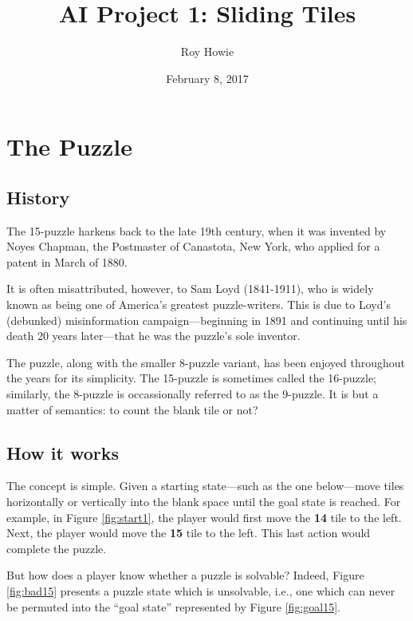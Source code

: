 \documentclass{article}
\begin{document}
\title{AI Project 1: Sliding Tiles}
\author{Roy Howie}
\date{February 8, 2017}
\maketitle

\section*{The Puzzle}
  \subsection*{History}
    The 15-puzzle harkens back to the late 19th century, when it was invented by
    Noyes Chapman, the Postmaster of Canastota, New York, who applied for a
    patent in March of 1880.

    It is often misattributed, however, to Sam Loyd (1841-1911), who is widely
    known as being one of America's greatest puzzle-writers. This is due to
    Loyd's (debunked) misinformation campaign---beginning in 1891 and continuing
    until his death 20 years later---that he was the puzzle's sole inventor.

    The puzzle, along with the smaller 8-puzzle variant, has been enjoyed
    throughout the years for its simplicity. The 15-puzzle is sometimes called
    the 16-puzzle; similarly, the 8-puzzle is occassionally referred to as the
    9-puzzle. It is but a matter of semantics: to count the blank tile or not?

  \subsection*{How it works}
    The concept is simple. Given a starting state---such as the one below---move
    tiles horizontally or vertically into the blank space until the goal state
    is reached. For example, in Figure \ref{fig:start1}, the player would first
    move the \textbf{14} tile to the left. Next, the player would move the
    \textbf{15} tile to the left. This last action would complete the puzzle.

    But how does a player know whether a puzzle is solvable? Indeed, Figure
    \ref{fig:bad15} presents a puzzle state which is unsolvable, i.e., one which
    can never be permuted into the ``goal state'' represented by Figure
    \ref{fig:goal15}.

  
\end{document}
